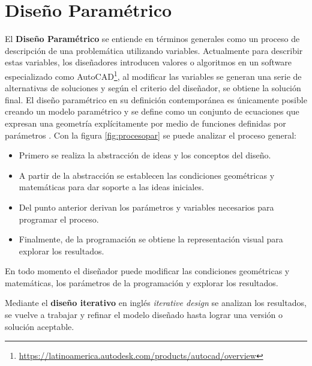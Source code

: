 \section{Diseño Paramétrico}
\label{cadparam}
El \textbf{Diseño Paramétrico} se entiende en términos generales como un proceso de descripción de una problemática utilizando variables. Actualmente para describir estas variables, los diseñadores introducen valores o algoritmos en un software especializado como AutoCAD\footnote{\url{https://latinoamerica.autodesk.com/products/autocad/overview}}, al modificar las variables se generan una serie de alternativas de soluciones y según el criterio del diseñador, se obtiene la solución final. El diseño paramétrico en su definición contemporánea es únicamente posible creando un modelo paramétrico y se define como un conjunto de ecuaciones que expresan una geometría explícitamente por medio de funciones definidas por parámetros \citep{burry2012new}. Con la figura \ref{fig:procesopar} se puede analizar el proceso general:

\begin{itemize}
    \item Primero se realiza la abstracción de ideas y los conceptos del diseño. 
    \item A partir de la abstracción se establecen las condiciones geométricas y matemáticas para dar soporte a las ideas iniciales.
    \item Del punto anterior derivan los parámetros y variables necesarios para programar el proceso. 
    \item Finalmente, de la programación se obtiene la representación visual para explorar los resultados. 
\end{itemize}

En todo momento el diseñador puede modificar las condiciones geométricas y matemáticas, los parámetros de la programación y explorar los resultados.

\newline
Mediante el \textbf{diseño iterativo} en inglés \textit{iterative design} \citep{blokdyk2018iterative} se analizan los resultados, se vuelve a trabajar y refinar el modelo diseñado hasta lograr una versión o solución aceptable. 



